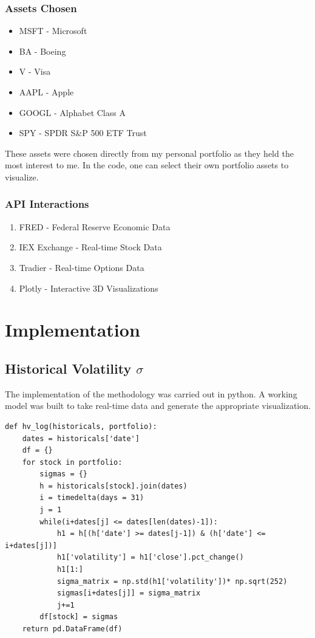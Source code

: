 \documentclass{article}
\begin{document}
\subsubsection {Assets Chosen}
\begin{itemize}
\item MSFT - Microsoft
\item BA - Boeing
\item V - Visa 
\item AAPL - Apple
\item GOOGL - Alphabet Class A
\item SPY -  SPDR S\&P 500 ETF Trust
\end{itemize}
\begin{flushleft} 
These assets were chosen directly from my personal portfolio as they held the most interest to me. In the code, one can select their own portfolio assets to visualize. 
\end{flushleft}
\subsubsection {API Interactions}
\begin{enumerate}
\item FRED - Federal Reserve Economic Data
\item IEX Exchange - Real-time Stock Data 
\item Tradier - Real-time Options Data
\item Plotly - Interactive 3D Visualizations
\end{enumerate}
\newpage


\section{Implementation}
\subsection{Historical Volatility $\sigma$}
\begin{flushleft}
The implementation of the methodology was carried out in python. A working model was built to take real-time data and generate the appropriate visualization. 
\begin{verbatim}
def hv_log(historicals, portfolio):
    dates = historicals['date']
    df = {}
    for stock in portfolio:
        sigmas = {}
        h = historicals[stock].join(dates)
        i = timedelta(days = 31)
        j = 1
        while(i+dates[j] <= dates[len(dates)-1]):
            h1 = h[(h['date'] >= dates[j-1]) & (h['date'] <= i+dates[j])]
            h1['volatility'] = h1['close'].pct_change()
            h1[1:]
            sigma_matrix = np.std(h1['volatility'])* np.sqrt(252)
            sigmas[i+dates[j]] = sigma_matrix
            j+=1
        df[stock] = sigmas
    return pd.DataFrame(df)
\end{verbatim}
\end{flushleft}
\end{document}
